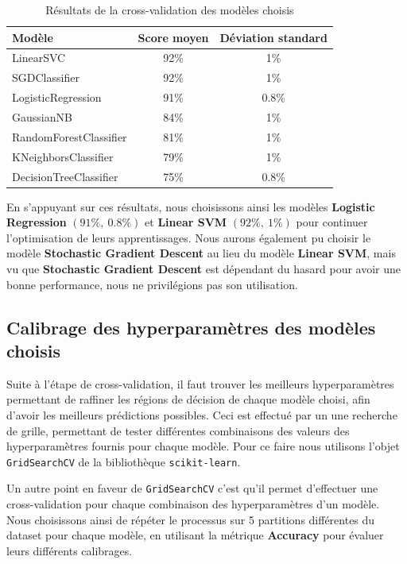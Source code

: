 \documentclass[12pt,a4paper]{report}
\theoremstyle{definition}
\begin{document}
\begin{table}
  \centering
  \begin{tabular}{|p{5cm}|c|c|}
    \hline
    \textbf{Modèle} & \textbf{Score moyen} & \textbf{Déviation standard}\\
    \hline
    \hline
    LinearSVC & 92\% & 1\%\\
    \hline
    SGDClassifier & 92\% & 1\%\\
    \hline
    LogisticRegression & 91\% & 0.8\%\\
    \hline
    GaussianNB & 84\% & 1\%\\
    \hline
    RandomForestClassifier & 81\% & 1\%\\
    \hline
    KNeighborsClassifier & 79\% & 1\%\\
    \hline
    DecisionTreeClassifier & 75\% & 0.8\%\\
    \hline
  \end{tabular}
  \caption{Résultats de la cross-validation des modèles choisis}
  \label{table:cross_validation}
\end{table}

En s'appuyant sur ces résultats, nous choisissons ainsi les modèles \textbf{Logistic Regression} $(91\%,~ 0.8\%)$ et \textbf{Linear SVM} $(92\%,~ 1\%)$ pour continuer l'optimisation de leurs apprentissages. Nous aurons également pu choisir le modèle \textbf{Stochastic Gradient Descent} au lieu du modèle \textbf{Linear SVM}, mais vu que \textbf{Stochastic Gradient Descent} est dépendant du hasard pour avoir une bonne performance, nous ne privilégions pas son utilisation.

\subsection{Calibrage des hyperparamètres des modèles choisis}
Suite à l'étape de cross-validation, il faut trouver les meilleurs hyperparamètres permettant de raffiner les régions de décision de chaque modèle
choisi, afin d’avoir les meilleurs prédictions possibles. Ceci est effectué par un une recherche de grille, permettant de tester différentes combinaisons des valeurs des hyperparamètres fournis pour chaque modèle. Pour ce faire nous utilisons l'objet \texttt{GridSearchCV} de la bibliothèque \texttt{scikit-learn}.

Un autre point en faveur de \texttt{GridSearchCV} c'est qu'il permet d'effectuer une cross-validation pour chaque combinaison des hyperparamètres d'un modèle. Nous choisissons ainsi de répéter le processus sur 5 partitions différentes du dataset pour chaque modèle, en utilisant la métrique \textbf{Accuracy} pour évaluer leurs différents calibrages.
\end{document}
